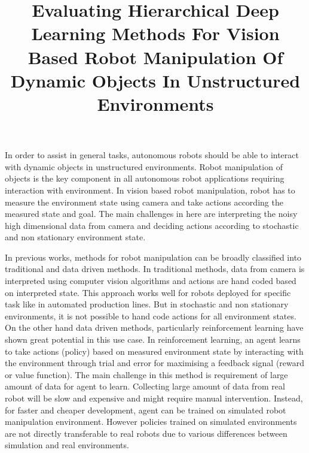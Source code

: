 \documentclass[11pt,a4paper]{article}
\title{Evaluating Hierarchical Deep Learning Methods For Vision Based Robot Manipulation Of Dynamic Objects In Unstructured Environments \vspace{-6ex}}
\date{}
\begin{document}
\maketitle

In order to assist in general tasks, autonomous robots should be able to interact with dynamic objects in unstructured environments. Robot manipulation of objects is the key component in all autonomous robot applications requiring interaction with environment. In vision based robot manipulation, robot has to measure the environment state using camera and take actions according the measured state and goal. The main challenges in here are interpreting the noisy high dimensional data from camera and deciding actions according to stochastic and non stationary environment state.

In previous works, methods for robot manipulation can be broadly classified into traditional and data driven methods. In traditional methods, data from camera is interpreted using computer vision algorithms and actions are hand coded based on interpreted state. This approach works well for robots deployed for specific task like in automated production lines. But in stochastic and non stationary environments, it is not possible to hand code actions for all environment states. On the other hand data driven methods, particularly reinforcement learning have shown great potential in this use case.  In reinforcement learning, an agent learns to take actions (policy) based on measured environment state by interacting with the environment through trial and error for maximising a feedback signal (reward or value function). The main challenge in this method is requirement of large amount of data for agent to learn. Collecting large amount of data from real robot will be slow and expensive and might require manual intervention. Instead, for faster and cheaper development, agent can be trained on simulated robot manipulation environment. However policies trained on simulated environments are not directly transferable to real robots due to various differences between simulation and real environments. 
\end{document}
